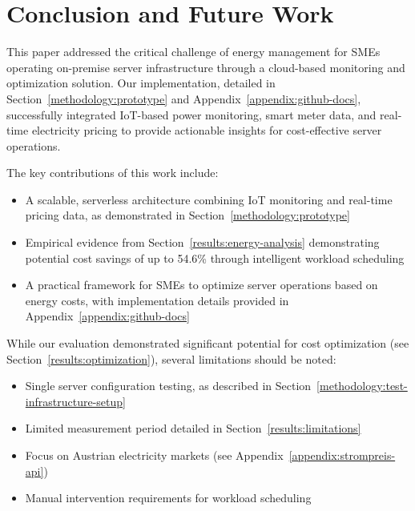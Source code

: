 


\section{Conclusion and Future Work}
\label{conclusion:conclusion}
This paper addressed the critical challenge of energy management for SMEs operating on-premise server infrastructure through a cloud-based monitoring and optimization solution. Our implementation, detailed in Section~\ref{methodology:prototype} and Appendix~\ref{appendix:github-docs}, successfully integrated IoT-based power monitoring, smart meter data, and real-time electricity pricing to provide actionable insights for cost-effective server operations.

The key contributions of this work include:
\begin{itemize}
    \item A scalable, serverless architecture combining IoT monitoring and real-time pricing data, as demonstrated in Section~\ref{methodology:prototype}
    \item Empirical evidence from Section~\ref{results:energy-analysis} demonstrating potential cost savings of up to 54.6\% through intelligent workload scheduling
    \item A practical framework for SMEs to optimize server operations based on energy costs, with implementation details provided in Appendix~\ref{appendix:github-docs}
\end{itemize}

While our evaluation demonstrated significant potential for cost optimization (see Section~\ref{results:optimization}), several limitations should be noted:
\begin{itemize}
    \item Single server configuration testing, as described in Section~\ref{methodology:test-infrastructure-setup}
    \item Limited measurement period detailed in Section~\ref{results:limitations}
    \item Focus on Austrian electricity markets (see Appendix~\ref{appendix:strompreis-api})
    \item Manual intervention requirements for workload scheduling
\end{itemize}

